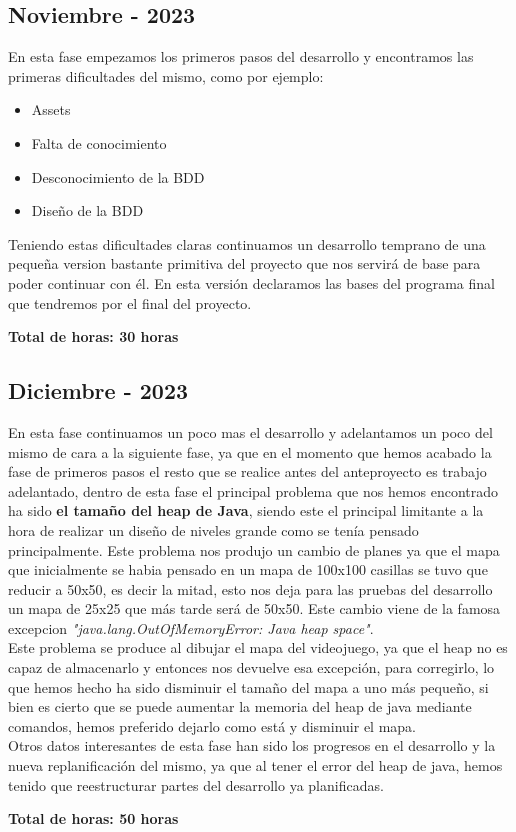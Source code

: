 \documentclass[a4paper]{article}
\begin{document}
\subsection{Noviembre - 2023}
En esta fase empezamos los primeros pasos del desarrollo y encontramos las primeras dificultades del mismo, como por ejemplo:
\begin{itemize}
    \item Assets
    \item Falta de conocimiento
    \item Desconocimiento de la BDD
    \item Diseño de la BDD
\end{itemize}
Teniendo estas dificultades claras continuamos un desarrollo temprano de una pequeña version bastante primitiva del proyecto que nos servirá de base para poder continuar con él. En esta versión declaramos las bases del programa final que tendremos por el final del proyecto.
\begin{flushright}
    \bf Total de horas: 30 horas
\end{flushright}

\clearpage
\subsection{Diciembre - 2023}
En esta fase continuamos un poco mas el desarrollo y adelantamos un poco del mismo de cara a la siguiente fase, ya que en el momento que hemos acabado la fase de primeros pasos el resto que se realice antes del anteproyecto es trabajo adelantado, dentro de esta fase el principal problema que nos hemos encontrado ha sido \textbf{el tamaño del heap de Java}, siendo este el principal limitante a la hora de realizar un diseño de niveles grande como se tenía pensado principalmente. Este problema nos produjo un cambio de planes ya que el mapa que inicialmente se habia pensado en un mapa de 100x100 casillas se tuvo que reducir a 50x50, es decir la mitad, esto nos deja para las pruebas del desarrollo un mapa de 25x25 que más tarde será de 50x50. Este cambio viene de la famosa excepcion \textit{"java.lang.OutOfMemoryError: Java heap space"}.\\
Este problema se produce al dibujar el mapa del videojuego, ya que el heap no es capaz de almacenarlo y entonces nos devuelve esa excepción, para corregirlo, lo que hemos hecho ha sido disminuir el tamaño del mapa a uno más pequeño, si bien es cierto que se puede aumentar la memoria del heap de java mediante comandos, hemos preferido dejarlo como está y disminuir el mapa.\\
Otros datos interesantes de esta fase han sido los progresos en el desarrollo y la nueva replanificación del mismo, ya que al tener el error del heap de java, hemos tenido que reestructurar partes del desarrollo ya planificadas.
\begin{flushright}
    \bf Total de horas: 50 horas
\end{flushright}
\end{document}

